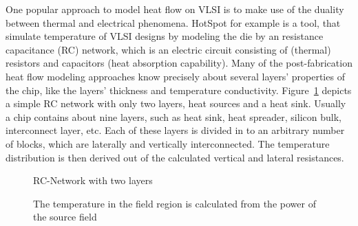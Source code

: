 \documentclass[12pt,twoside,doublepage]{article}
\begin{document}
One popular approach to model heat flow on VLSI is to make use of the duality between thermal and electrical phenomena. HotSpot \cite{Huang2006} for example is a tool, that simulate temperature of VLSI designs by modeling the die by an resistance capacitance (RC) network, which is an electric circuit consisting of (thermal) resistors and capacitors (heat absorption capability).
Many of the post-fabrication heat flow modeling approaches know precisely about several layers' properties of the chip, like the layers' thickness and temperature conductivity. Figure~\ref{fig:rcn} depicts a simple RC network with only two layers, heat sources and a heat sink.
Usually a chip contains about nine layers, such as heat sink, heat spreader, silicon bulk, interconnect layer, etc. Each of these layers is divided in to an arbitrary number of blocks, which are laterally and vertically interconnected.
The temperature distribution is then derived out of the calculated vertical and lateral resistances.
 
\begin{figure}[ht]
        \caption{RC-Network with two layers \cite{Happe}}
        \label{fig:rcn}
\end{figure}
 
\begin{figure}[ht]
        \caption{The temperature in the field region is calculated from the power of the source field \cite{Sapatnekar2005}}
        \label{fig:fields}
\end{figure}
 
\end{document}
